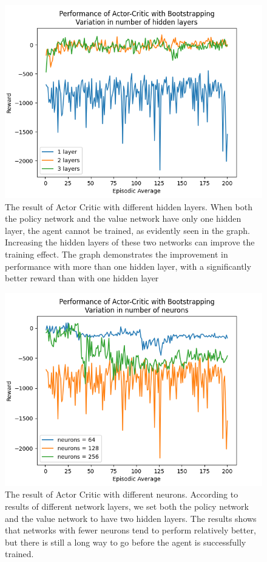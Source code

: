 \documentclass{article}
\begin{document}
\begin{figure}[h!]
\centering
\includegraphics[width=0.9\linewidth]{Report/images/07.Performance_of_Actor_Critic_BS_Layers.png}
\caption{\label{fig:ActorCritic for different Hidden Layers}The result of Actor Critic with different hidden layers. When both the policy network and the value network have only one hidden layer, the agent cannot be trained, as evidently seen in the graph. Increasing the hidden layers of these two networks can improve the training effect. The graph demonstrates the improvement in performance with more than one hidden layer, with a significantly better reward than with one hidden layer}
\end{figure}

\begin{figure}[h!]
\centering
\includegraphics[width=0.9\linewidth]{Report/images/08.Performance_of_Actor_Critic_BS_Neurons.png}
\caption{\label{fig:ActorCritic for different Neurons}The result of Actor Critic with different neurons. According to results of different network layers, we set both the policy network and the value network to have two hidden layers. The results shows that networks with fewer neurons tend to perform relatively better, but there is still a long way to go before the agent is successfully trained.}
\end{figure}
\end{document}
